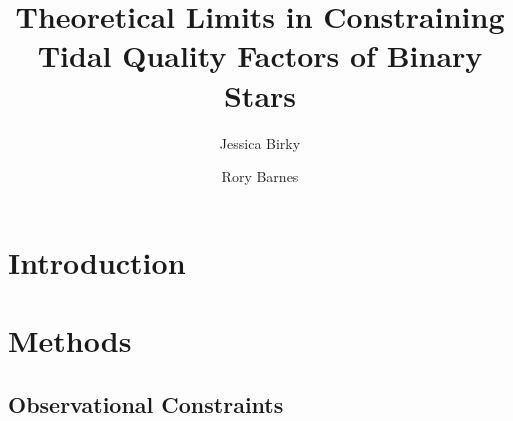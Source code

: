\documentclass[]{aastex631}
\begin{document}
\title{Theoretical Limits in Constraining Tidal Quality Factors of Binary Stars}



\author{Jessica Birky}
\author{Rory Barnes}


\begin{abstract}
\end{abstract}


\section{Introduction} \label{sec:intro}



\section{Methods} \label{sec:methods}



\subsection{Observational Constraints}
\end{document}
